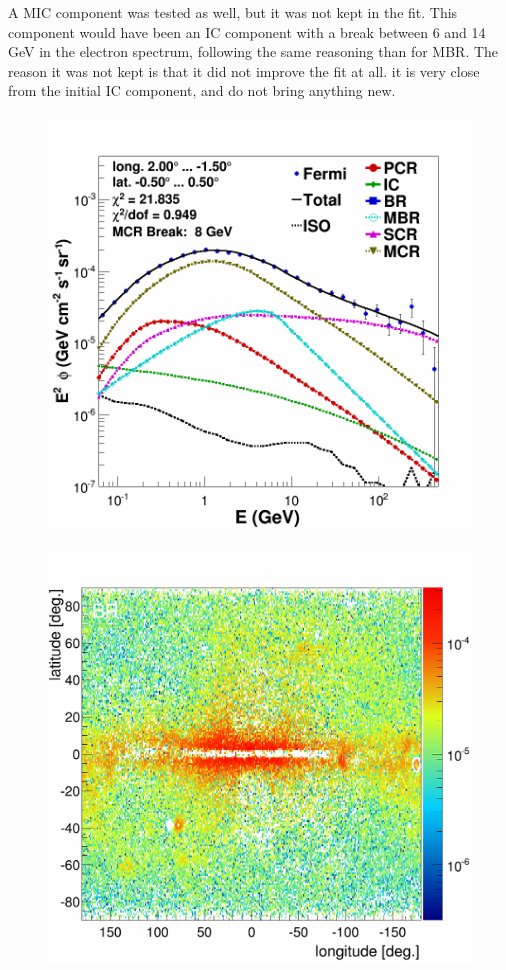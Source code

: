 A MIC component was tested as well, but it was not kept in the fit. This component would have been an IC component with a break between 6 and 14 GeV in the electron spectrum, following the same reasoning than for MBR.
The reason it was not kept is that it did not improve the fit at all. it is very close from the initial IC component, and do not bring anything new.



\begin{figure}[b]
  \centering
  \begin{minipage}[h]{0.45\textwidth}
  	\centering
	\includegraphics[width=1.\linewidth]{pic/discussion/MBR_CMZ.png}
  	\subcaption{}
  	\label{}
  \end{minipage}
  \hfill
  \begin{minipage}[h]{0.45\textwidth}
	  \centering
	  \includegraphics[width=1.\linewidth]{pic/discussion/MBR_BR_Integral.png}

\end{minipage}
\end{figure}
